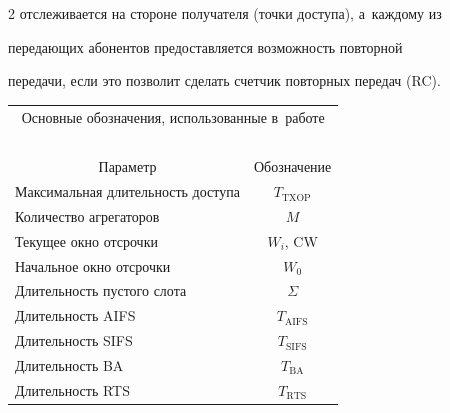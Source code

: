 \begin{multicols}{2}
отслеживается на стороне получателя (точки доступа), а~каждому из 


передающих абонентов пред\-остав\-ля\-ет\-ся возможность повторной 


передачи, если это позволит сделать счетчик повторных передач (RC).








\pagebreak










\noindent


{\small


\begin{center}





\begin{tabular}{|l|c|}


\multicolumn{2}{c}{Основные обозначения, использованные в~работе}\\


\multicolumn{2}{c}{\ }\\[-4pt]


\hline


\multicolumn{1}{|c|}{Параметр}&Обозначение\\


\hline


Максимальная длительность доступа&$T_{\mathrm{TXOP}}$\\


Количество агрегаторов&$M$\\


Текущее окно отсрочки&$W_i$, CW\\


Начальное окно отсрочки&$W_0$\\


Длительность пустого слота&$\Sigma$\\


Длительность AIFS&$T_{\mathrm{AIFS}}$\\


Длительность SIFS&$T_{\mathrm{SIFS}}$\\


Длительность BA&$T_{\mathrm{BA}}$\\


Длительность RTS&$T_{\mathrm{RTS}}$\\



\end{tabular}
\end{center}}
\end{multicols}
